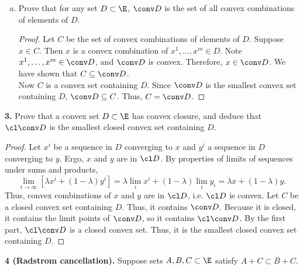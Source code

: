\documentclass[12pt, letterpaper]{article}
\numberwithin{equation}{subsection}
\begin{document}
\begin{enumerate}[(a)]
\begin{proof}
\begin{align*}
\prod_{i=1}^m (x^i)^{\lambda_i}\right) \\
& \sum_{i=1}^m \lambda_ix^i \geq \prod_{i=1}^m (x^i)^{\lambda_i}.
\end{align*}
\end{proof}
\item Prove that for any set $D\subset\E$, $\conv D$ is the set of 
all convex combinations of elements of $D$.
\begin{proof}
Let $C$ be the set of convex combinations of elements of $D$. 
Suppose $x\in C$. Then $x$ is a convex combination of $x^1, \ldots, 
x^m \in D$. Note $x^1,\ldots, x^m \in \conv D$, and $\conv D$ is 
convex. Therefore, $x\in\conv D$. We have shown that $C\subseteq\conv D$. \\
Now $C$ is a convex set containing $D$. Since $\conv D$ is the 
smallest convex set containing $D$, $\conv D\subseteq C$. 
Thus, $C=\conv D$.
\end{proof}
\end{enumerate}
\textbf{3.} Prove that a convex set $D\subset\E$ has convex closure, 
and deduce that $\cl\conv D$ is the smallest closed convex set 
containing $D$.
\begin{proof}
Let $x^i$ be a sequence in $D$ converging to $x$ and $y^i$ a sequence 
in $D$ converging to $y$. Ergo, $x$ and $y$ are in $\cl D$. By properties 
of limits of sequences under sums and products, 
\begin{equation*}
\lim_{i\to\infty} \left[\lambda x^i + (1-\lambda)y^i \right]
= \lambda \lim_i x^i + (1-\lambda)\lim_i y_i = \lambda x + (1-\lambda)y.
\end{equation*}
Thus, convex combinations of $x$ and $y$ are in $\cl D$, i.e. 
$\cl D$ is convex.
Let $C$ be a closed convex set containing $D$.
Thus, it contains $\conv D$. Because it is 
closed, it contains the limit points of 
$\conv D$, so it contains $\cl\conv D$.
By the first part, $\cl\conv D$ is a closed convex set. Thus, it 
is the smallest closed convex set containing $D$.
\end{proof} \noindent
\textbf{4 (Radstrom cancellation).} Suppose sets $A,B,C\subset\E$ 
satisfy $A+C\subset B+C$.
\end{document}
